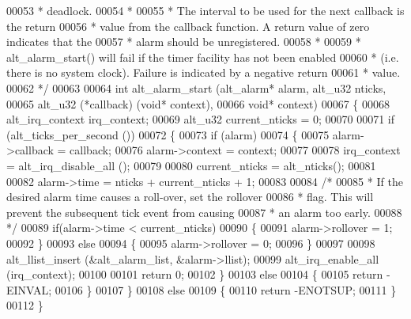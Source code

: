 \begin{DoxyCode}
00053 \textcolor{comment}{ * deadlock.}
00054 \textcolor{comment}{ *}
00055 \textcolor{comment}{ * The interval to be used for the next callback is the return}
00056 \textcolor{comment}{ * value from the callback function. A return value of zero indicates that the}
00057 \textcolor{comment}{ * alarm should be unregistered. }
00058 \textcolor{comment}{ * }
00059 \textcolor{comment}{ * alt\_alarm\_start() will fail if  the timer facility has not been enabled }
00060 \textcolor{comment}{ * (i.e. there is no system clock). Failure is indicated by a negative return }
00061 \textcolor{comment}{ * value.}
00062 \textcolor{comment}{ */} 
00063 
00064 \textcolor{keywordtype}{int} alt_alarm_start (alt_alarm* alarm, alt_u32 nticks,
00065                      alt_u32 (*callback) (\textcolor{keywordtype}{void}* context),
00066                      \textcolor{keywordtype}{void}* context)
00067 \{
00068   alt_irq_context irq\_context;
00069   alt_u32 current\_nticks = 0;
00070   
00071   \textcolor{keywordflow}{if} (alt_ticks_per_second ())
00072   \{
00073     \textcolor{keywordflow}{if} (alarm)
00074     \{
00075       alarm->callback = callback;
00076       alarm->context  = context;
00077  
00078       irq\_context = alt_irq_disable_all ();
00079       
00080       current\_nticks = alt_nticks();
00081       
00082       alarm->time = nticks + current\_nticks + 1; 
00083       
00084       \textcolor{comment}{/* }
00085 \textcolor{comment}{       * If the desired alarm time causes a roll-over, set the rollover}
00086 \textcolor{comment}{       * flag. This will prevent the subsequent tick event from causing}
00087 \textcolor{comment}{       * an alarm too early.}
00088 \textcolor{comment}{       */}
00089       \textcolor{keywordflow}{if}(alarm->time < current\_nticks)
00090       \{
00091         alarm->rollover = 1;
00092       \}
00093       \textcolor{keywordflow}{else}
00094       \{
00095         alarm->rollover = 0;
00096       \}
00097     
00098       alt_llist_insert (&alt_alarm_list, &alarm->llist);
00099       alt_irq_enable_all (irq\_context);
00100 
00101       \textcolor{keywordflow}{return} 0;
00102     \}
00103     \textcolor{keywordflow}{else}
00104     \{
00105       \textcolor{keywordflow}{return} -EINVAL;
00106     \}
00107   \}
00108   \textcolor{keywordflow}{else}
00109   \{
00110     \textcolor{keywordflow}{return} -ENOTSUP;
00111   \}
00112 \}
\end{DoxyCode}
